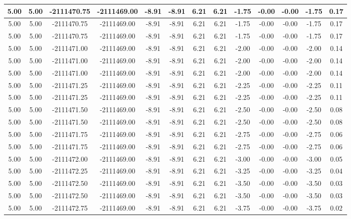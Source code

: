 \begin{table}[htbp]
\begin{adjustbox}{angle=90}
\begin{tabular}{|c|c|c|c|c|c|c|c|c|c|c|c|c|}
 5.00 & 5.00 & -2111470.75 & -2111469.00 & -8.91 & -8.91 & 6.21 & 6.21 & -1.75 & -0.00 & -0.00 & -1.75 & 0.17\\ \hline
 5.00 & 5.00 & -2111470.75 & -2111469.00 & -8.91 & -8.91 & 6.21 & 6.21 & -1.75 & -0.00 & -0.00 & -1.75 & 0.17\\ \hline
 5.00 & 5.00 & -2111470.75 & -2111469.00 & -8.91 & -8.91 & 6.21 & 6.21 & -1.75 & -0.00 & -0.00 & -1.75 & 0.17\\ \hline
 5.00 & 5.00 & -2111471.00 & -2111469.00 & -8.91 & -8.91 & 6.21 & 6.21 & -2.00 & -0.00 & -0.00 & -2.00 & 0.14\\ \hline
 5.00 & 5.00 & -2111471.00 & -2111469.00 & -8.91 & -8.91 & 6.21 & 6.21 & -2.00 & -0.00 & -0.00 & -2.00 & 0.14\\ \hline
 5.00 & 5.00 & -2111471.00 & -2111469.00 & -8.91 & -8.91 & 6.21 & 6.21 & -2.00 & -0.00 & -0.00 & -2.00 & 0.14\\ \hline
 5.00 & 5.00 & -2111471.25 & -2111469.00 & -8.91 & -8.91 & 6.21 & 6.21 & -2.25 & -0.00 & -0.00 & -2.25 & 0.11\\ \hline
 5.00 & 5.00 & -2111471.25 & -2111469.00 & -8.91 & -8.91 & 6.21 & 6.21 & -2.25 & -0.00 & -0.00 & -2.25 & 0.11\\ \hline
 5.00 & 5.00 & -2111471.50 & -2111469.00 & -8.91 & -8.91 & 6.21 & 6.21 & -2.50 & -0.00 & -0.00 & -2.50 & 0.08\\ \hline
 5.00 & 5.00 & -2111471.50 & -2111469.00 & -8.91 & -8.91 & 6.21 & 6.21 & -2.50 & -0.00 & -0.00 & -2.50 & 0.08\\ \hline
 5.00 & 5.00 & -2111471.75 & -2111469.00 & -8.91 & -8.91 & 6.21 & 6.21 & -2.75 & -0.00 & -0.00 & -2.75 & 0.06\\ \hline
 5.00 & 5.00 & -2111471.75 & -2111469.00 & -8.91 & -8.91 & 6.21 & 6.21 & -2.75 & -0.00 & -0.00 & -2.75 & 0.06\\ \hline
 5.00 & 5.00 & -2111472.00 & -2111469.00 & -8.91 & -8.91 & 6.21 & 6.21 & -3.00 & -0.00 & -0.00 & -3.00 & 0.05\\ \hline
 5.00 & 5.00 & -2111472.25 & -2111469.00 & -8.91 & -8.91 & 6.21 & 6.21 & -3.25 & -0.00 & -0.00 & -3.25 & 0.04\\ \hline
 5.00 & 5.00 & -2111472.50 & -2111469.00 & -8.91 & -8.91 & 6.21 & 6.21 & -3.50 & -0.00 & -0.00 & -3.50 & 0.03\\ \hline
 5.00 & 5.00 & -2111472.50 & -2111469.00 & -8.91 & -8.91 & 6.21 & 6.21 & -3.50 & -0.00 & -0.00 & -3.50 & 0.03\\ \hline
 5.00 & 5.00 & -2111472.75 & -2111469.00 & -8.91 & -8.91 & 6.21 & 6.21 & -3.75 & -0.00 & -0.00 & -3.75 & 0.02\\ \hline

\end{tabular}
\end{adjustbox}
\end{table}
